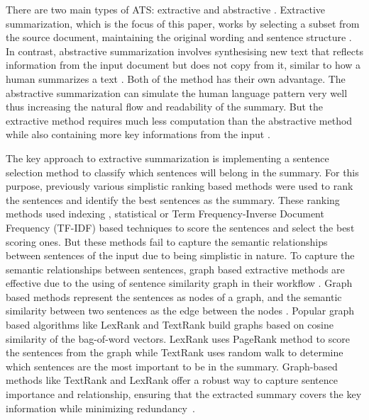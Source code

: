 \documentclass[acmlarge]{acmart}
\begin{document}
There are two main types of ATS: extractive and abstractive \cite{tas-2017-rev-text-sum-2}. Extractive summarization, which is the focus of this paper, works by selecting a subset from the source document, maintaining the original wording and sentence structure \cite{moratanch-2017-extractive-review}. In contrast, abstractive summarization involves synthesising new text that reflects information from the input document but does not copy from it, similar to how a human summarizes a text \cite{Moratanch-2016-abstractive-rev}. Both of the method has their own advantage. The abstractive summarization can simulate the human language pattern very well thus increasing the natural flow and readability of the summary. But the extractive method requires much less computation than the abstractive method while also containing more key informations from the input \cite{gupta-2010-extractive-rev}.

The key approach to extractive summarization is implementing a sentence selection method to classify which sentences will belong in the summary. For this purpose, previously various simplistic ranking based methods were used to rank the sentences and identify the best sentences as the summary. These ranking methods used indexing \cite{Baxendale_1958_firstsummarization}, statistical \cite{edmundson_1969_earlysum} or Term Frequency-Inverse Document Frequency (TF-IDF) \cite{das-2022-tfidf,sarkar-2012-tfidf-2,sarkar-2012-tfidf} based techniques to score the sentences and  select the best scoring ones. But these methods fail to capture the semantic relationships between sentences of the input due to being simplistic in nature. To capture the semantic relationships between sentences, graph based extractive methods are effective due to the using of sentence similarity graph in their workflow \cite{wafaa-2021-summary-comprehensive-review}. Graph based methods represent the sentences as nodes of a graph, and the semantic similarity between two sentences as the edge between the nodes \cite{moratanch-2017-extractive-review}. Popular graph based algorithms like LexRank \cite{Erkan-lexRank-2004} and TextRank \cite{mihalcea-2004-textrank} build graphs based on cosine similarity of the bag-of-word vectors. LexRank uses PageRank \cite{page-PageRank-1999} method to score the sentences from the graph while TextRank uses random walk to determine which sentences are the most important to be in the summary. Graph-based methods like TextRank and LexRank offer a robust way to capture sentence importance and relationship, ensuring that the extracted summary covers the key information while minimizing redundancy~\cite{wafaa-2021-summary-comprehensive-review}.
\end{document}
